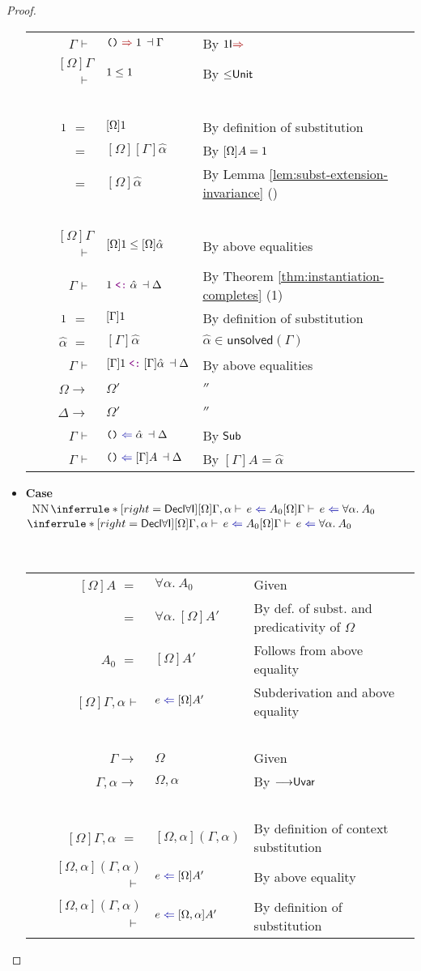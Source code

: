 \documentclass[a4paper]{article}
\makeatletter
\newcommand{\mathcolor}[2]{\text{\textcolor{#1}{\ensuremath{#2}}}}
\def\CompactJudgments{0}
\newcommand{\entails}{\mathrel{\ifnum\CompactJudgments=1\vdash \else \vdash\,\fi}}
\newcommand{\ctxoutsym}{\ifnum\CompactJudgments=1\dashv \else \,\dashv \fi}
\newcommand{\ctxout}[1]{\mathrel{\ctxoutsym}{#1}}
\newcommand{\tyname}[1]{\textsf{\normalfont #1}}
\newcommand{\unitexp}{\text{\normalfont \tt()}}
\newcommand{\unitty}{\tyname{1}}
\newcommand{\subtypingycolor}[1]{\textcolor{dDigPurple}{#1}}
\newcommand{\subtype}{\mathrel{\normalfont\texttt{\subtypingycolor{<:}}}}  \newcommand{\declsubtype}{\mathrel{\leq}}
\newcommand{\Theoremref}[1]{Theorem \ref{#1}}
\newcommand{\Lemmaref}[1]{Lemma \ref{#1} (\nameref{#1})}   \newcommand{\Lemref}[1]{\Lemma \ref{#1}}   \newcommand{\Conjectureref}[1]{Conjecture \ref{#1}}
\gdef\xxDerivationProofCaseColor{N}
\newcommand{\DerivationProofCase}[3]{\smallskip
     \item \parbox[t]{100ex}{\textbf{Case } \\[-0.5em]
       $~$\hspace{5ex}
       \if\xxDerivationProofCaseColor N\ensuremath{\Infer{#1}{#2}{#3}}
       \else \colorbox{\xxDerivationProofCaseColor}{\ensuremath{\Infer{#1}{#2}{#3}}}\fi }\nopagebreak \\[-0.8ex]
  }
\newcommand{\BeginProof}{\renewcommand{\arraystretch}{1.1} \begin{tabular}[b]{r@{}r @{} l  l}}
\newcommand{\EndProof}{\end{tabular} \renewcommand{\arraystretch}{\mydefaultarraystretch}}
\newcommand{\Hand}{\text{\Pointinghand~~~~}}
\newcommand{\Pf}[4] {&$#1$ $#2$\, & $#3$ & #4 \\}
\newcommand{\Pfmrg}[3] {&$#1$\, & $#2$ & #3 \\}
\newcommand{\mkpf}[4] {\Pf{#2}{#1\,}{#3}{#4}}
\newcommand{\eqPf}[3] {\mkpf{=}{#1}{#2}{#3}}
\newcommand{\continueeqPf}[2] {\mkpf{=}{~}{#1}{#2}}
\newcommand{\proofsep}{\,\\[-0.5em]}
\newenvironment{llproof}{\BeginProof}{\EndProof}
\newcommand{\ditto}{\ensuremath{''}}
\newcommand{\xunsolved}{\mathsf{unsolved}}
\newcommand{\unsolved}[1]{\xunsolved(#1)}
\newcommand{\AllSym}{\forall}
\newcommand{\xAll}[1]{\AllSym#1}
\newcommand{\All}[1]{\xAll{#1}.\:}
\newcommand{\Infer}[3]{\inferrule*[right={\text{\strut#1}}]{{}#2\mathstrut}{{}#3\mathstrut}}
\newcommand{\declsubjudgPf}[4] {\Pf{#1}{\entails}{{#2} \declsubtype {#3}}{#4}}
\newcommand{\subjudgPf}[5] {\Pf{#1}{\entails}{{#2} \subtype {#3} \ctxout{#4}}{#5}}
\newcommand{\substextendPf}[3] {\Pfmrg{{#1} \extendssym\,}{#2}{#3}}
\newcommand{\chkcolor}{dBlue}
\newcommand{\syncolor}{dRed}
\newcommand{\chk}{\mathrel{\mathcolor{\chkcolor}{\Leftarrow}}}
\newcommand{\uncoloredsyn}{{\Rightarrow}}
\newcommand{\syn}{\mathrel{\mathcolor{\syncolor}{\uncoloredsyn}}}
\newcommand{\declchkjudg}[3]{\ensuremath{{#1} \entails {#2} \chk {#3}}}
\newcommand{\chkjudgPf}[5]{\Pf{#1}{\entails}{{#2} \chk {#3} \ctxout{#4}}{#5}}
\newcommand{\synjudgPf}[5]{\Pf{#1}{\entails}{{#2} \syn {#3} \ctxout{#4}}{#5}}
\newcommand{\declchkjudgPf}[4]{\Pf{#1}{\entails}{{#2} \chk {#3}}{#4}}
\newcommand{\alltype}[1]{\All{#1}}
\newcommand{\extendssym}{\longrightarrow}
\newcommand{\ahat}{\hat{\alpha}}
\newcommand{\rulename}[1]{\text{\normalfont\textsf{#1}}}
\newcommand{\substextendrulename}[1]{\ensuremath{{\extendssym}{\rulename{#1}}}\xspace}
\newcommand{\substextendUU}{\substextendrulename{Uvar}}
\newcommand{\Dsubrulename}[1]{\ensuremath{{\declsubtype}\rulename{#1}}\xspace}
\newcommand{\DsubUnit}{\Dsubrulename{Unit}}
\newcommand{\Decltyrulename}[1]{\ensuremath{\rulename{Decl#1}}\xspace}
\newcommand{\DeclIntrorulename}[1]{\Decltyrulename{\ensuremath{#1}I}}
\newcommand{\DeclAllIntro}{\DeclIntrorulename{\AllSym}}
\newcommand{\Tyrulename}[1]{\ensuremath{\rulename{#1}}\xspace}
\newcommand{\IntroSynrulename}[1]{\Tyrulename{\ensuremath{#1}I$\syn$}}
\newcommand{\Sub}{\Tyrulename{Sub}}
\newcommand{\UnitIntroSyn}{\IntroSynrulename{\unitty}}
\makeatother
\begin{document}
\begin{proof}
\begin{itemize}
          \begin{llproof}
             \synjudgPf{\Gamma}{\unitexp}{\unitty}{\Gamma}   {By \UnitIntroSyn}
             \declsubjudgPf{[\Omega]\Gamma}{\unitty}{\unitty}   {By \DsubUnit}
             \proofsep
             \eqPf{\unitty} {[\Omega]\unitty}   {By definition of substitution}
             \continueeqPf {[\Omega][\Gamma]\ahat}   {By $[\Omega]A = \unitty$}
             \continueeqPf {[\Omega]\ahat}   {By \Lemmaref{lem:subst-extension-invariance}}
             \proofsep
             \declsubjudgPf{[\Omega]\Gamma}{[\Omega]\unitty}{[\Omega]\ahat}   {By above equalities}
             \subjudgPf{\Gamma}{\unitty}{\ahat}{\Delta}   {By \Theoremref{thm:instantiation-completes} (1)}
             \eqPf{\unitty}{[\Gamma]\unitty}  {By definition of substitution}
             \eqPf{\ahat}{[\Gamma]\ahat}  {$\ahat \in \unsolved{\Gamma}$}
             \subjudgPf{\Gamma}{[\Gamma]\unitty}{[\Gamma]\ahat}{\Delta}   {By above equalities}
\Hand  \substextendPf{\Omega}{\Omega'} {\ditto}
\Hand  \substextendPf{\Delta}{\Omega'} {\ditto}
             \chkjudgPf{\Gamma}{\unitexp}{\ahat}{\Delta}   {By \Sub}
\Hand        \chkjudgPf{\Gamma}{\unitexp}{[\Gamma]A}{\Delta}   {By $[\Gamma]A = \ahat$}
          \end{llproof}


     \DerivationProofCase{\DeclAllIntro}
           {\declchkjudg{[\Omega]\Gamma, \alpha}{e}{A_0}
           }
           {\declchkjudg{[\Omega]\Gamma}{{e}}{\alltype{\alpha}{A_0}}}

           \begin{llproof}
             \eqPf{[\Omega]A}{\alltype{\alpha}{A_0}}   {Given}
             \continueeqPf{\alltype{\alpha}{[\Omega]A'}}  {By def. of subst. and predicativity of $\Omega$}
             \eqPf{A_0}{[\Omega]A'}   {Follows from above equality}
             \declchkjudgPf{[\Omega]\Gamma, \alpha}{e}{[\Omega]A'}  {Subderivation and above equality}
             \proofsep
             \substextendPf{\Gamma}{\Omega}  {Given}
             \substextendPf{\Gamma, \alpha}{\Omega, \alpha}  {By \substextendUU}
             \proofsep
             \eqPf{[\Omega]\Gamma, \alpha}{[\Omega, \alpha](\Gamma, \alpha)}  {By definition of context substitution}
             \declchkjudgPf{[\Omega, \alpha](\Gamma, \alpha)}{e}{[\Omega]A'}  {By above equality}
             \declchkjudgPf{[\Omega, \alpha](\Gamma, \alpha)}{e}{[\Omega, \alpha]A'}  {By definition of substitution}
           \end{llproof}


\end{itemize}
\end{proof}
\end{document}
